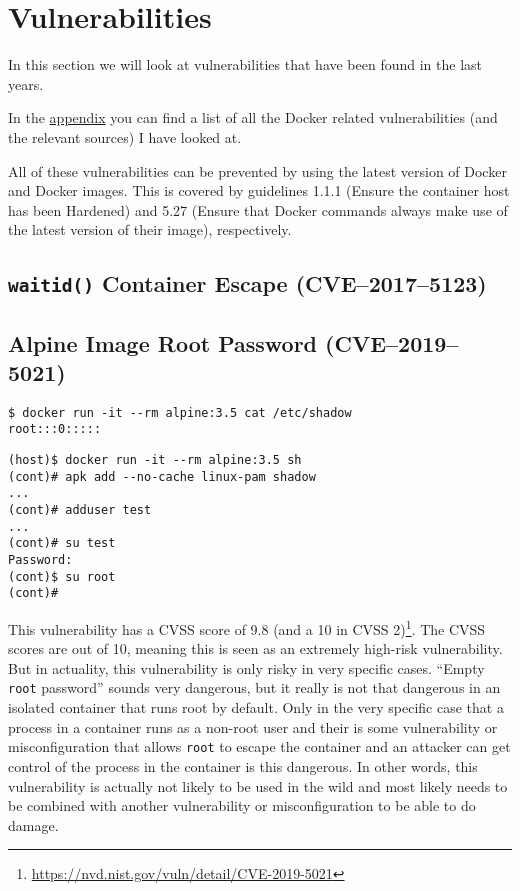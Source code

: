 \section{Vulnerabilities}
In this section we will look at vulnerabilities that have been found in the last years.

\hfill

In the \hyperref[appendix:CVE-List]{appendix} you can find a list of all the Docker related vulnerabilities (and the relevant sources) I have looked at.

\hfill

All of these vulnerabilities can be prevented by using the latest version of Docker and Docker images. This is covered by guidelines 1.1.1 (Ensure the container host has been Hardened) and 5.27 (Ensure that Docker commands always make use of the latest version of their image), respectively.

\subsection{\texorpdfstring{\lstinline{waitid()}}{waitid()} Container Escape (CVE--2017--5123)}

\subsection{Alpine Image Root Password (CVE--2019--5021)}\label{CVE-2019-5021}
\begin{lstlisting}
$ docker run -it --rm alpine:3.5 cat /etc/shadow
root:::0:::::
\end{lstlisting}

\begin{lstlisting}
(host)$ docker run -it --rm alpine:3.5 sh
(cont)# apk add --no-cache linux-pam shadow
...
(cont)# adduser test
...
(cont)# su test
Password:
(cont)$ su root
(cont)#
\end{lstlisting}

This vulnerability has a CVSS score of 9.8 (and a 10 in CVSS 2)\footnote{\url{https://nvd.nist.gov/vuln/detail/CVE-2019-5021}}. The CVSS scores are out of 10, meaning this is seen as an extremely high-risk vulnerability. But in actuality, this vulnerability is only risky in very specific cases. ``Empty \lstinline{root} password'' sounds very dangerous, but it really is not that dangerous in an isolated container that runs root by default. Only in the very specific case that a process in a container runs as a non-root user and their is some vulnerability or misconfiguration that allows \lstinline{root} to escape the container and an attacker can get control of the process in the container is this dangerous. In other words, this vulnerability is actually not likely to be used in the wild and most likely needs to be combined with another vulnerability or misconfiguration to be able to do damage.

